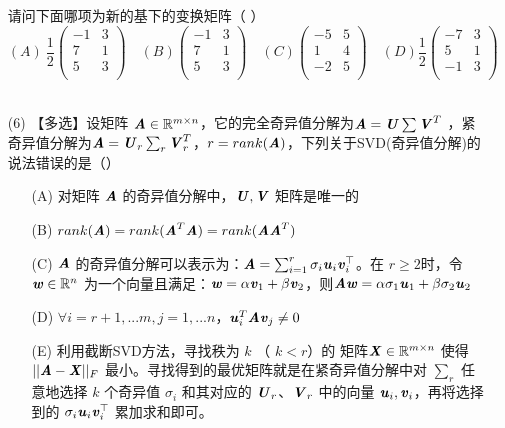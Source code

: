 \documentclass[12pt,a4paper,openany,twoside]{ctexbook}
\begin{document}
\begin{exercise}
\begin{itemize}
			请问下面哪项为新的基下的变换矩阵（ \quad）	
		$$
		(A)\  \frac{1}{2}
\begin{pmatrix}
-1 & 3 \\
7 & 1 \\
5 & 3 \\
\end{pmatrix}
\quad
(B) \begin{pmatrix}
-1 & 3 \\
7 & 1 \\
5 & 3 \\
\end{pmatrix}
\quad
(C) \begin{pmatrix}
-5 & 5 \\
1 & 4 \\
-2 & 5 \\
\end{pmatrix}
\quad
(D) \frac{1}{2}
\begin{pmatrix}
-7 & 3 \\
5 & 1 \\
-1 & 3 \\
\end{pmatrix}
		$$
\\
		\item [(6)] 【多选】设矩阵 $\MA\in \mathbb{R}^{m \times n}$，它的完全奇异值分解为$\MA=\MU \sum \MV^T$ ，紧奇异值分解为$\MA=\MU_r \sum_r \MV_r^T$，$r=rank(\MA)$，下列关于SVD(奇异值分解)的说法错误的是（\quad）
		
		
		\begin{itemize}
			\item [(A)] 对矩阵 $\MA$ 的奇异值分解中，$\MU,\MV$ 矩阵是唯一的
			\item [(B)] $rank(\MA)=rank(\MA^T\MA)=rank(\MA\MA^T)$
			\item [(C)] $\MA$ 的奇异值分解可以表示为：$\MA = \sum_{i=1}^r \sigma_i \Vu_i \Vv_i^\top$。在 $r \geq 2 $时，令 $\Vw \in \mathbb{R}^n $ 为一个向量且满足：$\Vw = \alpha \Vv_1 + \beta \Vv_2$，则$\MA\Vw=\alpha \sigma_1 \Vu_1+\beta \sigma_2 \Vu_2$
			\item [(D)] $\forall i=r+1,...m,j=1,...n$，$\Vu_i^T\MA\Vv_j\not=0$
			\item [(E)] 利用截断SVD方法，寻找秩为 $k$ （ $k<r$）的 矩阵$\MX\in \mathbb{R}^{m \times n}$ 使得 $||\MA-\MX||_F$ 最小。寻找得到的最优矩阵就是在紧奇异值分解中对 $\sum_r$ 任意地选择 $k$ 个奇异值 $\sigma_i$ 和其对应的 $\MU_r$、$\MV_r$ 中的向量 $\Vu_i,\Vv_i$，再将选择到的 $\sigma_i \Vu_i \Vv_i^\top$ 累加求和即可。
		\end{itemize}
	\end{itemize}
	
\end{exercise}
\end{document}
